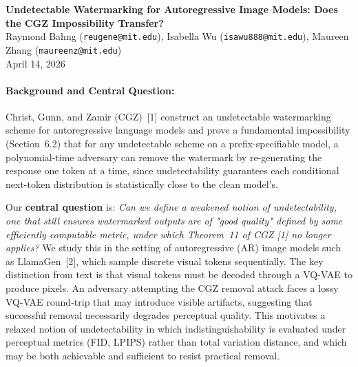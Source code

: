 \documentclass[10pt]{article}
\date{April 14, 2026}
\begin{document}
\begin{center}
    {\large \textbf{Undetectable Watermarking for Autoregressive Image Models: Does the CGZ Impossibility Transfer?}} \\[0.4em]
    {\small Raymond Bahng (\texttt{reugene@mit.edu}), Isabella Wu (\texttt{isawu888@mit.edu}), Maureen Zhang (\texttt{maureenz@mit.edu})} \\[0.4em]
    {\small April 14, 2026}
\end{center}
\thispagestyle{empty}

\paragraph{Background and Central Question:}
Christ, Gunn, and Zamir (CGZ)~[1] construct an undetectable watermarking
scheme for autoregressive language models and prove a fundamental
impossibility (Section~6.2) that for any undetectable scheme on a prefix-specifiable model, a polynomial-time adversary can remove the watermark by re-generating the response one token at a time, since undetectability guarantees each conditional next-token distribution is
statistically close to the clean model's.

Our \textbf{central question} is: \emph{Can we define a weakened notion of undetectability, one that still ensures watermarked outputs are of "good quality" defined by some efficiently computable metric, under which Theorem~11 of CGZ [1] no longer applies?} We study this in the setting of autoregressive (AR) image models such as LlamaGen~[2], which sample discrete visual tokens sequentially. The key distinction from text is
that visual tokens must be decoded through a VQ-VAE to produce pixels. An adversary attempting the CGZ removal attack faces a lossy VQ-VAE round-trip that may introduce visible artifacts, suggesting that successful removal necessarily degrades perceptual quality. This 
motivates a relaxed notion of undetectability in which 
indistinguishability is evaluated under perceptual metrics (FID, LPIPS) rather than total variation distance, and which may be both achievable and sufficient to resist practical removal.
\end{document}
